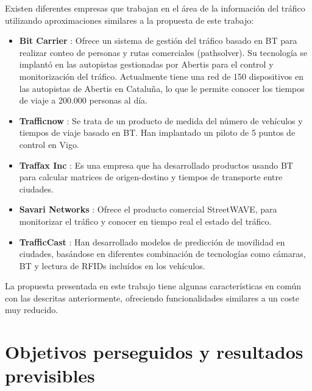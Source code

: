 \documentclass[twocolumn,twoside]{Jornadas}
\begin{document}
Existen diferentes empresas que trabajan en el área de la información del tráfico utilizando aproximaciones similares a la propuesta de este trabajo:

\begin{itemize}

 \item \textbf{Bit Carrier} \cite{patenteBC} \cite{BitCarrier}: Ofrece un sistema de gestión del tráfico basado en BT para realizar conteo de personas y rutas comerciales 
(pathsolver). Su tecnología se implantó en las autopistas gestionadas por Abertis para el control y monitorización del tráfico. Actualmente tiene una red de 
150 dispositivos en las autopistas de Abertis en Cataluña, lo que le permite conocer los tiempos de viaje a 200.000 personas al día.

 \item \textbf{Trafficnow} \cite{Trafficnow}: Se trata de un producto de medida del número de vehículos y tiempos de viaje basado en BT. Han implantado 
un piloto de 5 puntos de control en Vigo.

 \item \textbf{Traffax Inc} \cite{TraffaxInc}: Es una empresa que ha desarrollado productos usando BT para calcular matrices de origen-destino y tiempos de transporte entre ciudades.

 \item \textbf{Savari Networks} \cite{SavariNetworks}: Ofrece el producto comercial StreetWAVE, para monitorizar el tráfico y conocer en tiempo real el estado del tráfico.

 \item \textbf{TrafficCast} \cite{TrafficCast}: Han desarrollado modelos de predicción de movilidad en ciudades, basándose en diferentes 
combinación de tecnologías como cámaras, BT y lectura de RFIDs incluídos en los vehículos.

\end{itemize}


La propuesta presentada en este trabajo tiene algunas características
en común con las descritas anteriormente, ofreciendo funcionalidades
similares a un coste muy reducido. %


\section{Objetivos perseguidos y resultados previsibles}
\label{obj}
\end{document}
